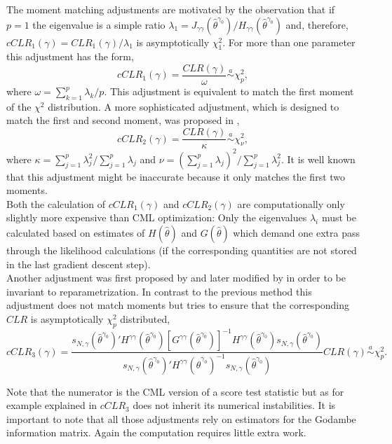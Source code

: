 \documentclass[12pt, a4paper]{article}
\numberwithin{defcounter}{section}
\numberwithin{excounter}{section}
\begin{document}
The moment matching adjustments are motivated by the observation that if $p=1$ the eigenvalue is a simple ratio $\lambda_1 = J_{\gamma\gamma}(\hat{\theta}^{\gamma_0}) / H_{\gamma\gamma}(\hat{\theta}^{\gamma_0})$ and, therefore, $cCLR_1(\gamma) = CLR_1(\gamma)/\lambda_1$ is asymptotically $\chi_1^2$. For more than one parameter this adjustment has the form,\begin{equation}
cCLR_{1}(\gamma) = \frac{CLR(\gamma)}{\omega} \overset{a}{\sim} \chi_{p}^2,
\end{equation}
where $\omega = \sum_{k=1}^p\lambda_k/p$. This adjustment is equivalent to match the first moment of the $\chi^2$ distribution. A more sophisticated adjustment, which is designed to match the first and second moment, was proposed in \cite{varin2008},
\begin{equation}
cCLR_{2}(\gamma) = \frac{CLR(\gamma)}{\kappa} \overset{a}{\sim} \chi_{\nu}^2,
\end{equation}
where $\kappa = \sum_{j=1}^p\lambda_j^2 / \sum_{j=1}^p\lambda_j$ and $\nu = (\sum_{j=1}^p\lambda_j)^2 / \sum_{j=1}^p\lambda_j^2$. It is well known that this adjustment might be inaccurate because it only matches the first two moments. 
\\
Both the calculation of $cCLR_1(\gamma)$ and $cCLR_2(\gamma)$ are computationally only slightly more expensive than CML optimization: Only the eigenvalues $\lambda_i$ must be calculated based on estimates of $H(\hat \theta)$ and $G(\hat \theta)$ which demand one extra pass through the likelihood calculations (if the corresponding quantities are not stored in the last gradient descent step).   
\\
Another adjustment was first proposed by \cite{chandler2007} and later modified by \cite{pace2011} in order to be invariant to reparametrization. In contrast to the previous method this adjustment does not match moments but tries to ensure that the corresponding $CLR$ is asymptotically $\chi_p^2$ distributed,
\begin{equation*}
cCLR_3(\gamma) = \frac{s_{N,\gamma}(\hat{\theta}^{\gamma_0})' H^{\gamma\gamma}(\hat{\theta}^{\gamma_0})  [G^{\gamma\gamma}(\hat{\theta}^{\gamma_0})]^{-1} H^{\gamma\gamma}(\hat{\theta}^{\gamma_0})
s_{N,\gamma}(\hat{\theta}^{\gamma_0}) }{s_{N,\gamma}(\hat{\theta}^{\gamma_0})' H^{\gamma\gamma}(\hat{\theta}^{\gamma_0})^{-1} s_{N,\gamma}(\hat{\theta}^{\gamma_0})} CLR(\gamma)  \overset{a}{\sim} \chi_{p}^2.
\end{equation*}

Note that the numerator is the \ac{CML} version of a score test statistic but as for example explained in \cite{cattelan2016} $cCLR_3$ does not inherit its numerical instabilities. It is important to note that all those adjustments rely on estimators for the Godambe information matrix. Again the computation requires little extra work. 
\end{document}
